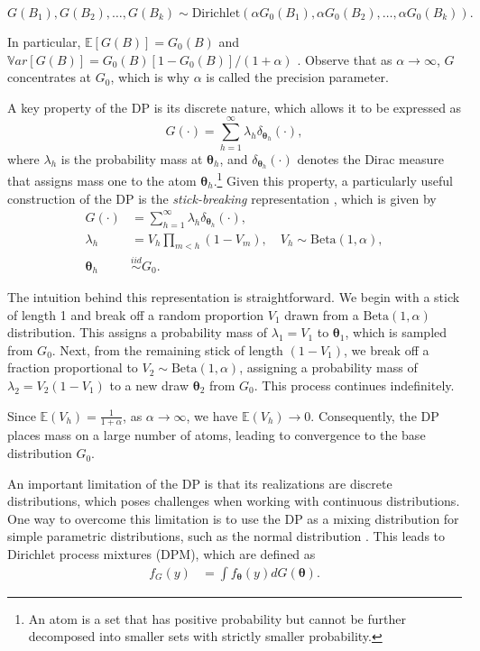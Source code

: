 \[
G(B_1), G(B_2), \dots, G(B_k) \sim \text{Dirichlet}(\alpha G_0(B_1), \alpha G_0(B_2), \dots, \alpha G_0(B_k)).
\]

In particular, $\mathbb{E}\left[G(B)\right]=G_0(B)$ and $\mathbb{V}ar\left[G(B)\right]=G_0(B)\left[1-G_0(B)\right]/(1+\alpha)$ \cite[p.~8]{Muller2015}. Observe that as $\alpha  \rightarrow \infty$, $G$ concentrates at $G_0$, which is why $\alpha$ is called the precision parameter.

A key property of the DP is its discrete nature, which allows it to be expressed as  
\[
G(\cdot)=\sum_{h=1}^{\infty}\lambda_h\delta_{\boldsymbol{\theta}_h}(\cdot),
\]
where $\lambda_h$ is the probability mass at $\boldsymbol{\theta}_h$, and $\delta_{\boldsymbol{\theta}_h}(\cdot)$ denotes the Dirac measure that assigns mass one to the atom $\boldsymbol{\theta}_h$.\footnote{An atom is a set that has positive probability but cannot be further decomposed into smaller sets with strictly smaller probability.} Given this property, a particularly useful construction of the DP is the \textit{stick-breaking} representation \cite{Sethuraman1994}, which is given by  
\begin{align*}
	G(\cdot)&=\sum_{h=1}^{\infty}\lambda_h\delta_{\boldsymbol{\theta}_h}(\cdot),\\
	\lambda_h&=V_h\prod_{m<h}(1-V_m), \quad V_h\sim \text{Beta}(1,\alpha),\\
	\boldsymbol{\theta}_h&\stackrel{iid}{\sim} G_0.
\end{align*}  

The intuition behind this representation is straightforward. We begin with a stick of length 1 and break off a random proportion $V_1$ drawn from a $\text{Beta}(1,\alpha)$ distribution. This assigns a probability mass of $\lambda_1=V_1$ to $\boldsymbol{\theta}_1$, which is sampled from $G_0$. Next, from the remaining stick of length $(1-V_1)$, we break off a fraction proportional to $V_2 \sim \text{Beta}(1,\alpha)$, assigning a probability mass of $\lambda_2=V_2(1-V_1)$ to a new draw $\boldsymbol{\theta}_2$ from $G_0$. This process continues indefinitely. 

Since $\mathbb{E}(V_h) = \frac{1}{1+\alpha}$, as $\alpha \rightarrow \infty$, we have $\mathbb{E}(V_h) \rightarrow 0$. Consequently, the DP places mass on a large number of atoms, leading to convergence to the base distribution $G_0$.  

An important limitation of the DP is that its realizations are discrete distributions, which poses challenges when working with continuous distributions. One way to overcome this limitation is to use the DP as a mixing distribution for simple parametric distributions, such as the normal distribution \cite{Escobar1995}. This leads to Dirichlet process mixtures (DPM), which are defined as  
\begin{align*}
	f_G(y) &= \int f_{\boldsymbol{\theta}}(y) dG(\boldsymbol{\theta}).
\end{align*}

